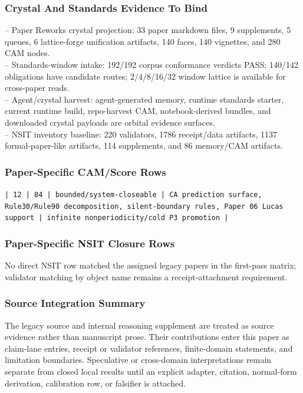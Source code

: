 \documentclass[11pt]{article}
\begin{document}
\subsubsection*{Crystal And Standards Evidence To Bind}

\noindent{}-- Paper Reworks crystal projection: 33 paper markdown files, 9 supplements, 5 queues, 6 lattice-forge unification artifacts, 140 faces, 140 vignettes, and 280 CAM nodes.\\
\noindent{}-- Standards-window intake: 192/192 corpus conformance verdicts PASS; 140/142 obligations have candidate routes; 2/4/8/16/32 window lattice is available for cross-paper reads.\\
\noindent{}-- Agent/crystal harvest: agent-generated memory, runtime standards starter, current runtime build, repo-harvest CAM, notebook-derived bundles, and downloaded crystal payloads are orbital evidence surfaces.\\
\noindent{}-- NSIT inventory baseline: 220 validators, 1786 receipt/data artifacts, 1137 formal-paper-like artifacts, 114 supplements, and 86 memory/CAM artifacts.\\

\subsubsection*{Paper-Specific CAM/Score Rows}

\noindent\texttt{| 12 | 84 | bounded/system-closeable | CA prediction surface, Rule30/Rule90 decomposition, silent-boundary rules, Paper 06 Lucas support | infinite nonperiodicity/cold P3 promotion |}\\

\subsubsection*{Paper-Specific NSIT Closure Rows}

No direct NSIT row matched the assigned legacy papers in the first-pass matrix; validator matching by object name remains a receipt-attachment requirement.

\subsubsection*{Source Integration Summary}

The legacy source and internal reasoning supplement are treated as source
evidence rather than manuscript prose. Their contributions enter this paper as
claim-lane entries, receipt or validator references, finite-domain statements,
and limitation boundaries. Speculative or cross-domain interpretations remain
separate from closed local results until an explicit adapter, citation,
normal-form derivation, calibration row, or falsifier is attached.
\end{document}

